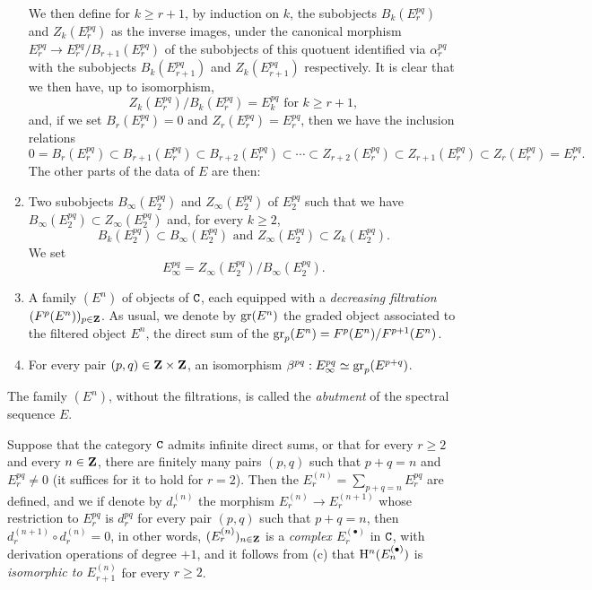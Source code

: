 \begin{env}[11.1.1]
\begin{enumerate}[label=(\alph*)]
  We then define for $k\geq r+1$, by induction on $k$, the subobjects $B_k(E_r^{pq})$ and $Z_k(E_r^{pq})$ as the inverse images, under the canonical morphism $E_r^{pq}\to E_r^{pq}/B_{r+1}(E_r^{pq})$ of the subobjects of this quotuent identified via $\alpha_r^{pq}$ with the subobjects $B_k(E_{r+1}^{pq})$ and $Z_k(E_{r+1}^{pq})$ respectively.
It is clear that we then have, up to isomorphism,
  \[
    Z_k(E_r^{pq})/B_k(E_r^{pq})=E_k^{pq}\text{ for }k\geq r+1,
    \tag{11.1.1.1}
  \]
  and, if we set $B_r(E_r^{pq})=0$ and $Z_r(E_r^{pq})=E_r^{pq}$, then we have the inclusion relations
  \[
    0=B_r(E_r^{pq})\subset B_{r+1}(E_r^{pq})\subset B_{r+2}(E_r^{pq})\subset\cdots\subset Z_{r+2}(E_r^{pq})\subset Z_{r+1}(E_r^{pq})\subset Z_r(E_r^{pq})=E_r^{pq}.
    \tag{11.1.1.2}
  \]
  The other parts of the data of $E$ are then:
  \item Two subobjects $B_\infty(E_2^{pq})$ and $Z_\infty(E_2^{pq})$ of $E_2^{pq}$ such that we have $B_\infty(E_2^{pq})\subset Z_\infty(E_2^{pq})$ and, for every $k\geq 2$,
    \[
      B_k(E_2^{pq})\subset B_\infty(E_2^{pq})\text{ and }Z_\infty(E_2^{pq})\subset Z_k(E_2^{pq}).
    \]
    We set
    \[
      E_\infty^{pq}=Z_\infty(E_2^{pq})/B_\infty(E_2^{pq}).
      \tag{11.1.1.3}
    \]
  \item
{}
    A family $(E^n)$ of objects of $\mathtt{C}$, each equipped with a \emph{decreasing filtration $(F^p(E^n))_{p\in\mathbf{Z}}$}.
    As usual, we denote by ${\mathop{\mathrm{gr}}\nolimits}(E^n)$ the graded object associated to the filtered object $E^n$, the direct sum of the ${\mathop{\mathrm{gr}}\nolimits}_p(E^n)=F^p(E^n)/F^{p+1}(E^n)$.
  \item For every pair $(p,q)\in\mathbf{Z}\times\mathbf{Z}$, an isomorphism $\beta^{pq}:E_\infty^{pq}\simeq{\mathop{\mathrm{gr}}\nolimits}_p(E^{p+q})$.
\end{enumerate}

The family $(E^n)$, without the filtrations, is called the \emph{abutment} of the spectral sequence $E$.

Suppose that the category $\mathtt{C}$ admits infinite direct sums, or that for every $r\geq 2$ and every $n\in\mathbf{Z}$, there are finitely many pairs $(p,q)$ such that $p+q=n$ and $E_r^{pq}\neq 0$ (it suffices for it to hold for $r=2$).
Then the $E_r^{(n)}=\sum_{p+q=n}E_r^{pq}$ are defined, and we if denote by $d_r^{(n)}$ the morphism $E_r^{(n)}\to E_r^{(n+1)}$ whose restriction to $E_r^{pq}$ is $d_r^{pq}$ for every pair $(p,q)$ such that $p+q=n$, then $d_r^{(n+1)}\circ d_r^{(n)}=0$, in other words, $(E_r^{(n)})_{n\in\mathbf{Z}}$ is a \emph{complex $E_r^{(\bullet)}$} in $\mathtt{C}$, with derivation operations of degree $+1$, and it follows from (c) that $\mathrm{H}^n(E_n^{(\bullet)})$ is \emph{isomorphic to $E_{r+1}^{(n)}$} for every $r\geq 2$.
\end{env}

